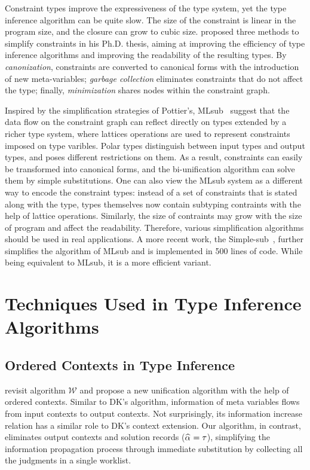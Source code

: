 Constraint types improve the expressiveness of the type system,
yet the type inference algorithm can be quite slow.
The size of the constraint is linear in the program size,
and the closure can grow to cubic size.
\citet{pottier1998phd} proposed three methods to simplify constraints in his Ph.D. thesis,
aiming at improving the efficiency of type inference algorithms and
improving the readability of the resulting types.
By \emph{canonization}, constraints are converted to canonical forms
with the introduction of new meta-variables;
\emph{garbage collection} eliminates constraints that do not affect the type;
finally, \emph{minimization} shares nodes within the constraint graph.

Inspired by the simplification strategies of Pottier's,
MLsub~\citep{mlsub} suggest that the data flow on the constraint graph
can reflect directly on types extended by a richer type system,
where lattices operations are used to represent constraints imposed on type varibles.
Polar types distinguish between input types and output types,
and poses different restrictions on them.
As a result, constraints can easily be transformed into canonical forms,
and the bi-unification algorithm can solve them by simple substitutions.
One can also view the MLsub system as a different way to encode the constraint types:
instead of a set of constraints that is stated along with the type,
types themselves now contain subtyping contraints with the help of lattice operations.
Similarly, the size of contraints may grow with the size of program
and affect the readability.
Therefore, various simplification algorithms should be used in real applications.
A more recent work, the Simple-sub~\citep{Parreaux2020simple}, further simplifies
the algorithm of MLsub and is implemented in 500 lines of code.
While being equivalent to MLsub, it is a more efficient variant.

\section{Techniques Used in Type Inference Algorithms}

\subsection{Ordered Contexts in Type Inference}
\citet{gundry2010type} revisit algorithm $\mathcal{W}$ and
propose a new unification algorithm with the help of ordered contexts.
Similar to DK's algorithm, information of meta variables flows from input contexts to output contexts.
Not surprisingly, its information increase relation has a similar role to DK's context extension.
Our algorithm, in contrast,
eliminates output contexts and solution records ($\al = \tau$),
simplifying the information propagation process through immediate substitution
by collecting all the judgments in a single worklist.

